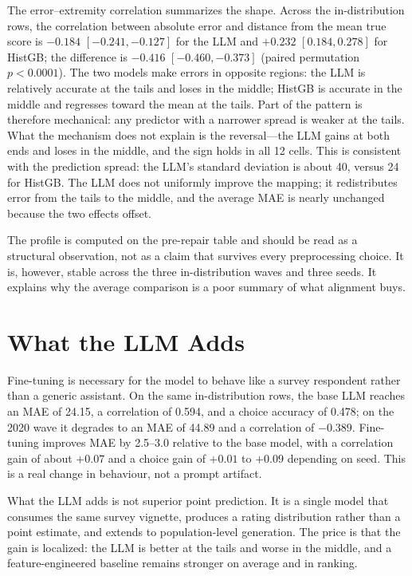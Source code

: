 The error--extremity correlation summarizes the shape. Across the in-distribution
rows, the correlation between absolute error and distance from the mean true
score is $-0.184$ $[-0.241, -0.127]$ for the LLM and $+0.232$ $[0.184, 0.278]$
for HistGB; the difference is $-0.416$ $[-0.460, -0.373]$ (paired permutation
$p<0.0001$). The two models make errors in opposite regions: the LLM is
relatively accurate at the tails and loses in the middle; HistGB is accurate in
the middle and regresses toward the mean at the tails. Part of the pattern is
therefore mechanical: any predictor with a narrower spread is weaker at the
tails. What the mechanism does not explain is the reversal---the LLM gains at
both ends and loses in the middle, and the sign holds in all 12 cells. This is
consistent with
the prediction spread: the LLM's standard deviation is about 40, versus 24 for
HistGB. The LLM does not uniformly improve the mapping; it redistributes error
from the tails to the middle, and the average MAE is nearly unchanged because
the two effects offset.

The profile is computed on the pre-repair table and should be read as a
structural observation, not as a claim that survives every preprocessing choice.
It is, however, stable across the three in-distribution waves and three seeds.
It explains why the average comparison is a poor summary of what alignment
buys.

\section{What the LLM Adds}

Fine-tuning is necessary for the model to behave like a survey respondent rather
than a generic assistant. On the same in-distribution rows, the base LLM reaches
an MAE of 24.15, a correlation of 0.594, and a choice accuracy of 0.478; on the
2020 wave it degrades to an MAE of 44.89 and a correlation of $-0.389$.
Fine-tuning improves MAE by 2.5--3.0 relative to the base model, with a
correlation gain of about $+0.07$ and a choice gain of $+0.01$ to $+0.09$
depending on seed. This is a real change in behaviour, not a prompt artifact.

What the LLM adds is not superior point prediction. It is a single model that
consumes the same survey vignette, produces a rating distribution rather than a
point estimate, and extends to population-level generation. The price is that
the gain is localized: the LLM is better at the tails and worse in the middle,
and a feature-engineered baseline remains stronger on average and in ranking.

